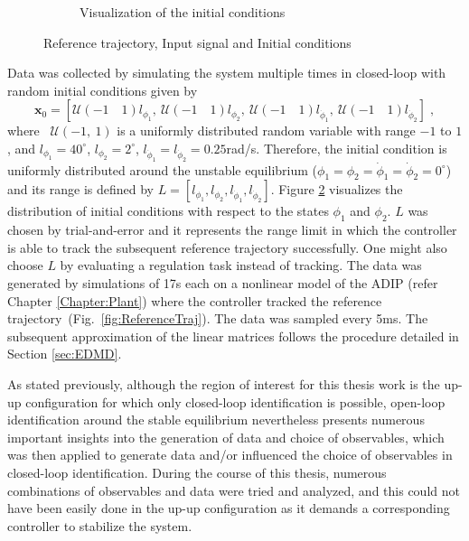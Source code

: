\begin{figure}[ht]
\begin{subfigure}[t]{0.485\textwidth}
    \caption{Visualization of the initial conditions}
    \label{fig:InitCondns}
    \end{subfigure}
    \caption{Reference trajectory, Input signal and Initial conditions}
\end{figure}
\newpage
Data was collected by simulating the system multiple times in closed-loop with random initial conditions given by
\begin{equation}
\label{Eq:MultInit}
    \mathbf{x}_0 = [\mathcal{U}(-1 \quad 1)l_{\phi_1},~\mathcal{U}(-1 \quad 1)l_{\phi_2},~\mathcal{U}(-1 \quad 1)l_{\dot{\phi}_1},~\mathcal{U}(-1 \quad 1)l_{\dot{\phi}_2}] \;,
\end{equation}
where~ $\mathcal{U}(-1,~1)$ is a uniformly distributed random variable with range $-1$ to $1$, and $l_{\phi_1} = 40^{\circ}$, $l_{\phi_2} = 2^{\circ}$, $l_{\dot{\phi}_1} = l_{\dot{\phi}_2} = 0.25$rad/s. Therefore, the initial condition is uniformly distributed around the unstable equilibrium ($\phi_1 = \phi_2 = \dot{\phi}_1 = \dot{\phi}_2 = 0^{\circ}$) and its range is defined by $L = [l_{\phi_1}, l_{\phi_2}, l_{\dot{\phi}_1}, l_{\dot{\phi}_2} ]$. Figure \ref{fig:InitCondns} visualizes the distribution of initial conditions with respect to the states $\phi_1$ and $\phi_2$. $L$ was chosen by trial-and-error and it represents the range limit in which the controller is able to track the subsequent reference trajectory successfully. One might also choose $L$ by evaluating a regulation task instead of tracking. The data was generated by simulations of 17s each on a nonlinear model of the ADIP (refer Chapter \ref{Chapter:Plant}) where the controller tracked the reference trajectory~(Fig.~\ref{fig:ReferenceTraj}). The data was sampled every 5ms. The subsequent approximation of the linear matrices follows the procedure detailed in Section \ref{sec:EDMD}. \par
As stated previously, although the region of interest for this thesis work is the up-up configuration for which only closed-loop identification is possible, open-loop identification around the stable equilibrium nevertheless presents numerous important insights into the generation of data and choice of observables, which was then applied to generate data and/or influenced the choice of observables in closed-loop identification. During the course of this thesis, numerous combinations of observables and data were tried and analyzed, and this could not have been easily done in the up-up configuration as it demands a corresponding controller to stabilize the system.\par
